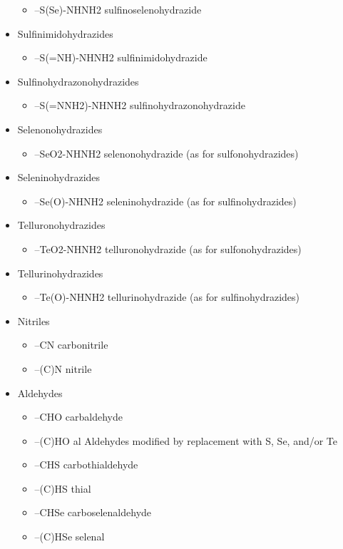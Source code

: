 \documentclass[a4paper,12pt]{report}
\begin{document}
\begin{itemize}
\begin{itemize}
\item –S(Se)-NHNH2 sulfinoselenohydrazide 
\end{itemize}
\item Sulfinimidohydrazides 
\begin{itemize}
\item –S(=NH)-NHNH2 sulfinimidohydrazide 
\end{itemize}
\item Sulfinohydrazonohydrazides 
\begin{itemize}
\item –S(=NNH2)-NHNH2 sulfinohydrazonohydrazide 
\end{itemize}
\item Selenonohydrazides 
\begin{itemize}
\item –SeO2-NHNH2 selenonohydrazide (as for sulfonohydrazides) 
\end{itemize}
\item Seleninohydrazides 
\begin{itemize}
\item –Se(O)-NHNH2 seleninohydrazide (as for sulfinohydrazides) 
\end{itemize}
\item Telluronohydrazides 
\begin{itemize}
\item –TeO2-NHNH2 telluronohydrazide (as for sulfonohydrazides) 
\end{itemize}
\item Tellurinohydrazides 
\begin{itemize}
\item –Te(O)-NHNH2 tellurinohydrazide (as for sulfinohydrazides) 
\end{itemize}
\item Nitriles 
\begin{itemize}
\item –CN carbonitrile 
\item –(C)N nitrile 
\end{itemize}
\item Aldehydes 
\begin{itemize}
\item –CHO carbaldehyde 
\item –(C)HO al Aldehydes modified by replacement with S, Se, and/or Te 
\item –CHS carbothialdehyde 
\item –(C)HS thial 
\item –CHSe carboselenaldehyde 
\item –(C)HSe selenal 

\end{itemize}
\end{itemize}
\end{document}
